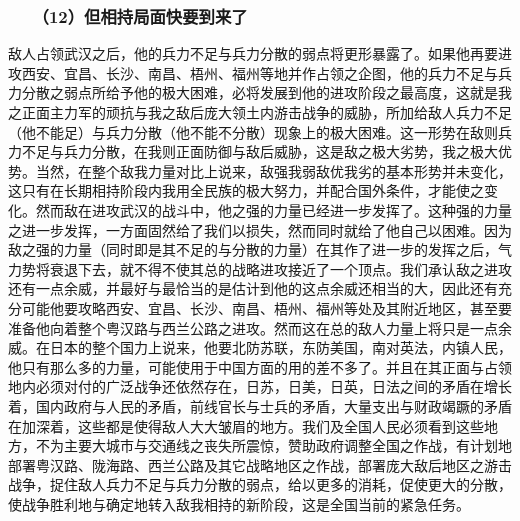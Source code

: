 \documentclass[cn,11pt,chinese]{elegantbook}
\def\myformat#1{\hfil\hfil #1}
\begin{document}
\subsubsection*{\myformat{　　（12）但相持局面快要到来了}}
敌人占领武汉之后，他的兵力不足与兵力分散的弱点将更形暴露了。如果他再要进攻西安、宜昌、长沙、南昌、梧州、福州等地并作占领之企图，他的兵力不足与兵力分散之弱点所给予他的极大困难，必将发展到他的进攻阶段之最高度，这就是我之正面主力军的顽抗与我之敌后庞大领土内游击战争的威胁，所加给敌人兵力不足（他不能足）与兵力分散（他不能不分散）现象上的极大困难。这一形势在敌则兵力不足与兵力分散，在我则正面防御与敌后威胁，这是敌之极大劣势，我之极大优势。当然，在整个敌我力量对比上说来，敌强我弱敌优我劣的基本形势并未变化，这只有在长期相持阶段内我用全民族的极大努力，并配合国外条件，才能使之变化。然而敌在进攻武汉的战斗中，他之强的力量已经进一步发挥了。这种强的力量之进一步发挥，一方面固然给了我们以损失，然而同时就给了他自己以困难。因为敌之强的力量（同时即是其不足的与分散的力量）在其作了进一步的发挥之后，气力势将衰退下去，就不得不使其总的战略进攻接近了一个顶点。我们承认敌之进攻还有一点余威，并最好与最恰当的是估计到他的这点余威还相当的大，因此还有充分可能他要攻略西安、宜昌、长沙、南昌、梧州、福州等处及其附近地区，甚至要准备他向着整个粤汉路与西兰公路之进攻。然而这在总的敌人力量上将只是一点余威。在日本的整个国力上说来，他要北防苏联，东防美国，南对英法，内镇人民，他只有那么多的力量，可能使用于中国方面的用的差不多了。并且在其正面与占领地内必须对付的广泛战争还依然存在，日苏，日美，日英，日法之间的矛盾在增长着，国内政府与人民的矛盾，前线官长与士兵的矛盾，大量支出与财政竭蹶的矛盾在加深着，这些都是使得敌人大大皱眉的地方。我们及全国人民必须看到这些地方，不为主要大城市与交通线之丧失所震惊，赞助政府调整全国之作战，有计划地部署粤汉路、陇海路、西兰公路及其它战略地区之作战，部署庞大敌后地区之游击战争，捉住敌人兵力不足与兵力分散的弱点，给以更多的消耗，促使更大的分散，使战争胜利地与确定地转入敌我相持的新阶段，这是全国当前的紧急任务。\\
\end{document}
